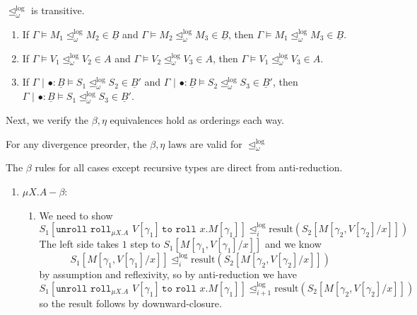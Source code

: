 \documentclass[acmsmall,screen,12pt]{acmart}
\newif\iflong
\renewcommand{\u}{\underline}
\newcommand{\pipe}{\,\,|\,\,}
\newcommand{\apreorder}{\trianglelefteq}
\newcommand{\ilrof}[2]{\mathrel{{#1}^{\text{log}}_{#2}}}
\newcommand{\ilr}[1]{\ilrof{\apreorder}{#1}}
\newcommand{\roll}{\kw{roll}}
\newcommand{\rollty}[1]{\texttt{roll}_{#1}\,\,}
\newcommand{\result}{\text{result}}
\newcommand{\kw}[1]{\texttt{#1}\,\,}
\newcommand{\pmmuXtoYinZ}[3]{\kw{unroll} #1 \,\kw{to} \roll #2. #3}
\begin{document}
{\begin{longproof}
\begin{enumerate}
  \end{enumerate}
\end{longproof}
\fi
\begin{corollary}
  \begin{shortonly}
    $\ilrof\apreorder \omega$ is transitive.
  \end{shortonly}
  \begin{longonly}
    \hfill
  \begin{enumerate}
  \item If $\Gamma \vDash M_1 \ilrof\apreorder \omega M_2 \in \u B$ and
    $\Gamma \vDash M_2 \ilrof\apreorder \omega M_3 \in \u B$, then
    $\Gamma \vDash M_1 \ilrof\apreorder \omega M_3 \in \u B$.
  \item If $\Gamma \vDash V_1 \ilrof\apreorder \omega V_2 \in A$ and
    $\Gamma \vDash V_2 \ilrof\apreorder \omega V_3 \in A$, then
    $\Gamma \vDash V_1 \ilrof\apreorder \omega V_3 \in A$.
  \item If $\Gamma \pipe \bullet : \u B \vDash S_1 \ilrof\apreorder \omega S_2 \in \u B'$ and
    $\Gamma\pipe \bullet : \u B \vDash S_2 \ilrof\apreorder \omega S_3 \in \u B'$, then
    $\Gamma\pipe \bullet : \u B \vDash S_1 \ilrof\apreorder \omega S_3 \in \u B'$.
  \end{enumerate}
  \end{longonly}
\end{corollary}

\iflong
Next, we verify the $\beta, \eta$ equivalences hold as orderings each
way.
\begin{lemma}[$\beta, \eta$]
  For any divergence preorder, the $\beta, \eta$
  laws are valid for $\ilrof\apreorder \omega$
\end{lemma}
\begin{longproof}
  The $\beta$ rules for all cases except recursive types are direct
  from anti-reduction.
  \begin{enumerate}
  \item $\mu X.A-\beta$:
    \begin{enumerate}
    \item We need to show
      \[ S_1[\pmmuXtoYinZ {\rollty{\mu X.A} V[\gamma_1]} x M[\gamma_1]] \ilr i \result(S_2[M[\gamma_2,V[\gamma_2]/x]]) \]
      The left side takes $1$ step to $S_1[M[\gamma_1,V[\gamma_1]/x]]$ and we know
      \[ S_1[M[\gamma_1,V[\gamma_1]/x]] \ilr i \result (S_2[M[\gamma_2,V[\gamma_2]/x]])  \]
      by assumption and reflexivity, so by anti-reduction we have
      \[ S_1[\pmmuXtoYinZ {\rollty{\mu X.A} V[\gamma_1]} x M[\gamma_1]] \ilr {i+1} \result(S_2[M[\gamma_2,V[\gamma_2]/x]]) \]
      so the result follows by downward-closure.
      

\end{enumerate}
\end{enumerate}
\end{longproof}}
\end{document}

